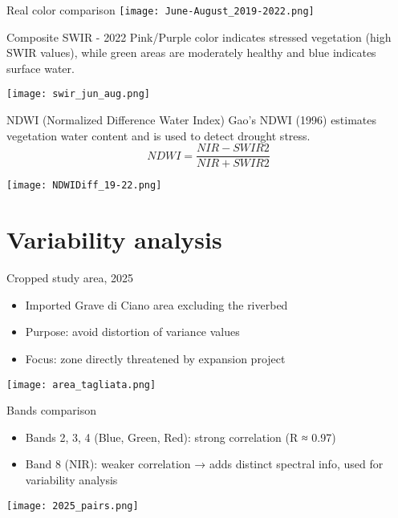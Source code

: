 \documentclass{beamer}
\begin{document}
\begin{frame}{Real color comparison}
     \centering
    \texttt{[image: June-August\_2019-2022.png]}
    \caption{\footnotesize Real color satellite images of the Grave di Ciano in June (top) and August (bottom) of both 2019 (left) and 2022 (right).}
\end{frame}

\begin{frame}{Composite SWIR - 2022}
     \centering
     Pink/Purple color indicates stressed vegetation (high SWIR values), while green areas are moderately healthy and blue indicates surface water. \bigskip
     
     \texttt{[image: swir\_jun\_aug.png]}
    \caption{\footnotesize {SWIR bands in June (left) and August (right) 2022}}
\end{frame}


\begin{frame}{NDWI (Normalized Difference Water Index) }
     \centering
     Gao's NDWI (1996) estimates vegetation water content and is used to detect drought stress.
     \begin{equation}
        NDWI = \frac{NIR - SWIR2}{NIR +SWIR2}
     \end{equation}
     
    \texttt{[image: NDWIDiff\_19-22.png]}
    \caption{\footnotesize Gao's NDWI Delta: June-August}
\end{frame}

\section{Variability analysis}

\begin{frame}{Cropped study area, 2025}
     \centering
    \begin{itemize}
        \item Imported Grave di Ciano area excluding the riverbed
        \item Purpose: avoid distortion of variance values
        \item Focus: zone directly threatened by expansion project
    \end{itemize}
    \texttt{[image: area\_tagliata.png]}
\end{frame}


\begin{frame}{Bands comparison}
     \centering
    \begin{itemize}
        \item Bands 2, 3, 4 (Blue, Green, Red): strong correlation (R ≈ 0.97)
        \item Band 8 (NIR): weaker correlation → adds distinct spectral info, used for variability analysis
    \end{itemize}
    \texttt{[image: 2025\_pairs.png]}
\end{frame}
\end{document}
